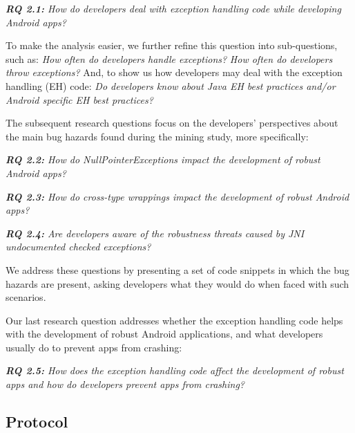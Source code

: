 \emph{\textbf{RQ 2.1:} How do developers deal with exception handling code while developing Android apps?} 

To make the analysis easier, we further refine this question into sub-questions, such as: \emph{How often do developers handle exceptions?} \emph{How often do developers throw exceptions?} And, to show us how developers may deal with the exception handling (EH) code: \emph{Do developers know about Java EH best practices and/or Android specific EH best practices?}
 
The subsequent research questions focus on the developers' perspectives about the main bug hazards found during the mining study, more specifically: 

\emph{\textbf{RQ 2.2:} How do NullPointerExceptions impact the development of robust Android apps?}

\emph{\textbf{RQ 2.3:} How do cross-type wrappings impact the development of robust Android apps?}

\emph{\textbf{RQ 2.4:} Are developers aware of the robustness threats caused by JNI undocumented checked exceptions?}




We address these questions by presenting a set of code snippets in which
the bug hazards are present, asking developers what they would do when faced with such scenarios.

Our last research question addresses
whether the exception handling code helps with the development of robust Android applications, and what developers usually do to prevent apps from crashing:

\emph{\textbf{RQ 2.5:} How does the exception handling code affect the development of robust apps and how do developers prevent apps from crashing?}

\subsection{Protocol}


